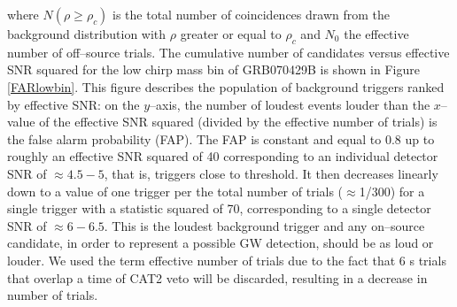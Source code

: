 \noindent where $N(\rho \geq \rho_c)$ is the total number of coincidences drawn from the background distribution with $\rho$ greater or equal to $\rho_c$ and $N_0$ the effective number of off--source trials. The cumulative number of candidates versus effective SNR squared for the low chirp mass bin of GRB070429B is shown in Figure \ref{FARlowbin}. This figure describes the population of background triggers ranked by effective SNR: on the $y$--axis, the number of loudest events louder than the $x$--value of the effective SNR squared (divided by the effective number of trials) is the false alarm probability (FAP). The FAP is constant and equal to 0.8 up to roughly an effective SNR squared of 40 corresponding to an individual detector SNR of $\approx4.5 - 5$, that is, triggers close to threshold. It then decreases linearly down to a value of one trigger per the total number of trials ($\approx$1/300) for a single trigger with a statistic squared of 70, corresponding to a single detector SNR of $\approx6 - 6.5$. This is the loudest background trigger and any on--source candidate, in order to represent a possible GW detection, should be as loud or louder. We used the term effective number of trials due to the fact that 6 s trials that overlap a time of CAT2 veto will be discarded, resulting in a decrease in number of trials.

